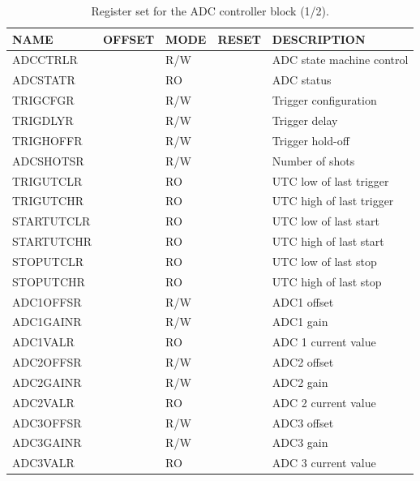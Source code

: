 \documentclass{article}
\begin{document}
\begin{table}[htbp]
  \centering
  \begin{tabularx}{\textwidth}{|l|r|l|l|X|}
    \hline
    \textbf{NAME} & \textbf{OFFSET} & \textbf{MODE} & \textbf{RESET} & \textbf{DESCRIPTION} \\
    \hline
    \hline
    ADCCTRLR & & R/W & & ADC state machine control\\
    \hline
    ADCSTATR & & RO & & ADC status \\
    \hline
    TRIGCFGR & & R/W & & Trigger configuration \\
    \hline
    TRIGDLYR & & R/W & & Trigger delay \\
    \hline
    TRIGHOFFR & & R/W & & Trigger hold-off \\
    \hline
    ADCSHOTSR & & R/W & & Number of shots \\
    \hline
    TRIGUTCLR & & RO & & UTC low of last trigger \\
    \hline
    TRIGUTCHR & & RO & & UTC high of last trigger \\
    \hline
    STARTUTCLR & & RO & & UTC low of last start \\
    \hline
    STARTUTCHR & & RO & & UTC high of last start \\
    \hline
    STOPUTCLR & & RO & & UTC low of last stop \\
    \hline
    STOPUTCHR & & RO & & UTC high of last stop \\
    \hline
    ADC1OFFSR & & R/W & & ADC1 offset \\
    \hline
    ADC1GAINR & & R/W & & ADC1 gain \\
    \hline
    ADC1VALR & & RO & & ADC 1 current value \\
    \hline
    ADC2OFFSR & & R/W & & ADC2 offset \\
    \hline
    ADC2GAINR & & R/W & & ADC2 gain \\
    \hline
    ADC2VALR & & RO & & ADC 2 current value \\
    \hline
    ADC3OFFSR & & R/W & & ADC3 offset \\
    \hline
    ADC3GAINR & & R/W & & ADC3 gain \\
    \hline
    ADC3VALR & & RO & & ADC 3 current value \\
    \hline
  \end{tabularx}
  \caption{Register set for the ADC controller block (1/2).}
  \label{tab:adc_control1}
\end{table}
\end{document}
